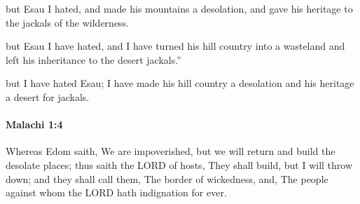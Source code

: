 			\begin{versebox}
					\item[BHS] 
					\item[LXX] 
					\item[ASV] but Esau I hated, and made his mountains a desolation, and gave his heritage to the jackals of the wilderness.
					\item[NIV] but Esau I have hated, and I have turned his hill country into a wasteland and left his inheritance to the desert jackals.”
					\item[NRSV] but I have hated Esau; I have made his hill country a desolation and his heritage a desert for jackals.
			\end{versebox}

		\paragraph{Malachi 1:4} %
			\label{MALACHI-1-4}

			Whereas Edom saith, We are impoverished, but we will return and build the desolate places; thus saith the LORD of hosts, They shall build, but I will throw down; and they shall call them, The border of wickedness, and, The people against whom the LORD hath indignation for ever.

